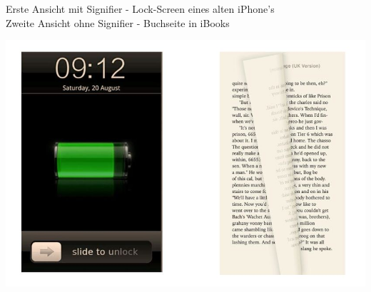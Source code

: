 Erste Ansicht mit Signifier - Lock-Screen eines alten iPhone's \\

Zweite Ansicht ohne Signifier - Buchseite in iBooks

\includegraphics[scale=.75]{images/aufg1.jpg}

